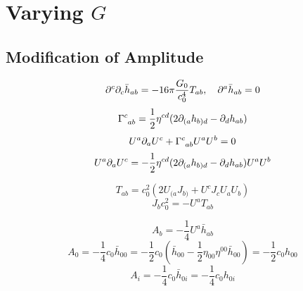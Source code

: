 \chapter{Varying $G$}

\section{Modification of Amplitude}

\begin{equation}
    \partial^c\partial_c\bar{h}_{ab}=-16\pi\frac{G_0}{c_0^4}T_{ab},\quad\partial^a\bar{h}_{ab}=0
\end{equation}
\begin{equation}
    \Gamma^c_{\ph{c}ab}=\frac{1}{2}\eta^{cd}(2\p_{(a}{h}_{b)d}-\p_d{h}_{ab})
\end{equation}
\begin{equation}
    U^a\p_aU^c+\Gamma^c_{\ph{c}ab}U^aU^b=0
\end{equation}
\begin{equation}
    U^a\partial_aU^c=-\frac{1}{2}\eta^{cd}(2\partial_{(a}{h}_{b)d}-\partial_d{h}_{ab})U^aU^b
\end{equation}

\begin{equation}
    T_{ab}=c_0^2(2U_{(a}J_{b)}+U^cJ_cU_aU_b)
\end{equation}
\begin{equation}
    J_bc_0^2=-U^aT_{ab}
\end{equation}

\begin{equation}
    A_b
    =-\frac{1}{4}U^a\bar{h}_{ab}
\end{equation}
\begin{equation}
    A_0
    =-\frac{1}{4}c_0\bar{h}_{00}
    =-\frac{1}{2}c_0(\bar{h}_{00}-\frac{1}{2}\eta_{00}\eta^{00}\bar{h}_{00})=-\frac{1}{2}c_0h_{00}
\end{equation}
\begin{equation}
    A_i=-\frac{1}{4}c_0\bar{h}_{0i}=-\frac{1}{4}c_0{h}_{0i}
\end{equation}

